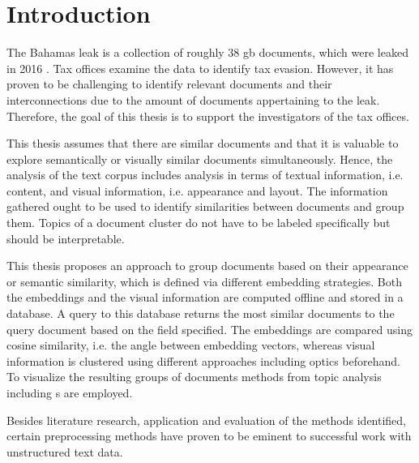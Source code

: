 \chapter{Introduction}\label{ch:introduction}

The Bahamas leak is a collection of roughly 38 \ac{gb} documents, which were leaked in 2016 \cite{data-corpus-bahamas-leaks}.
Tax offices examine the data to identify tax evasion.
However, it has proven to be challenging to identify relevant documents and their interconnections due to the amount of documents appertaining to the leak.
Therefore, the goal of this thesis is to support the investigators of the tax offices.

This thesis assumes that there are similar documents and that it is valuable to explore semantically or visually similar documents simultaneously.
Hence, the analysis of the text corpus includes analysis in terms of textual information, i.e. content, 
and visual information, i.e. appearance and layout.
The information gathered ought to be used to identify similarities between documents and group them.
Topics of a document cluster do not have to be labeled specifically but should be interpretable.

This thesis proposes an approach to group documents based on their appearance or semantic similarity, 
which is defined via different embedding strategies.
Both the embeddings and the visual information are computed offline and stored in a database.
A query to this database returns the most similar documents to the query document based on the field specified.
The embeddings are compared using cosine similarity, i.e. the angle between embedding vectors, 
whereas visual information is clustered using different approaches including \ac{optics} beforehand.
To visualize the resulting groups of documents methods from topic analysis including \wordcloud{}s are employed.

Besides literature research, application and evaluation of the methods identified, 
certain preprocessing methods have proven to be eminent to successful work with unstructured text data.
